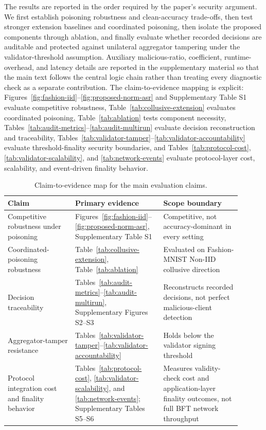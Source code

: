 \documentclass[preprint,12pt]{elsarticle}
\begin{document}
The results are reported in the order required by the paper's security argument. We first establish poisoning robustness and clean-accuracy trade-offs, then test stronger extension baselines and coordinated poisoning, then isolate the proposed components through ablation, and finally evaluate whether recorded decisions are auditable and protected against unilateral aggregator tampering under the validator-threshold assumption. Auxiliary malicious-ratio, coefficient, runtime-overhead, and latency details are reported in the supplementary material so that the main text follows the central logic chain rather than treating every diagnostic check as a separate contribution. The claim-to-evidence mapping is explicit: Figures~\ref{fig:fashion-iid}--\ref{fig:proposed-norm-asr} and Supplementary Table S1 evaluate competitive robustness, Table~\ref{tab:collusive-extension} evaluates coordinated poisoning, Table~\ref{tab:ablation} tests component necessity, Tables~\ref{tab:audit-metrics}--\ref{tab:audit-multirun} evaluate decision reconstruction and traceability, Tables~\ref{tab:validator-tamper}--\ref{tab:validator-accountability} evaluate threshold-finality security boundaries, and Tables~\ref{tab:protocol-cost}, \ref{tab:validator-scalability}, and \ref{tab:network-events} evaluate protocol-layer cost, scalability, and event-driven finality behavior.

\begin{table}[t]
\centering
\caption{Claim-to-evidence map for the main evaluation claims.}
\label{tab:claim-evidence}
\small
\begin{tabular}{>{\raggedright\arraybackslash}p{0.26\linewidth}>{\raggedright\arraybackslash}p{0.34\linewidth}>{\raggedright\arraybackslash}p{0.30\linewidth}}
\toprule
Claim & Primary evidence & Scope boundary \\
\midrule
Competitive robustness under poisoning & Figures~\ref{fig:fashion-iid}--\ref{fig:proposed-norm-asr}, Supplementary Table S1 & Competitive, not accuracy-dominant in every setting \\
Coordinated-poisoning robustness & Table~\ref{tab:collusive-extension}, Table~\ref{tab:ablation} & Evaluated on Fashion-MNIST Non-IID collusive direction \\
Decision traceability & Tables~\ref{tab:audit-metrics}--\ref{tab:audit-multirun}, Supplementary Figures S2--S3 & Reconstructs recorded decisions, not perfect malicious-client detection \\
Aggregator-tamper resistance & Tables~\ref{tab:validator-tamper}--\ref{tab:validator-accountability} & Holds below the validator signing threshold \\
Protocol integration cost and finality behavior & Tables~\ref{tab:protocol-cost}, \ref{tab:validator-scalability}, and \ref{tab:network-events}; Supplementary Tables S5--S6 & Measures validity-check cost and application-layer finality outcomes, not full BFT network throughput \\
\bottomrule
\end{tabular}
\end{table}
\end{document}
